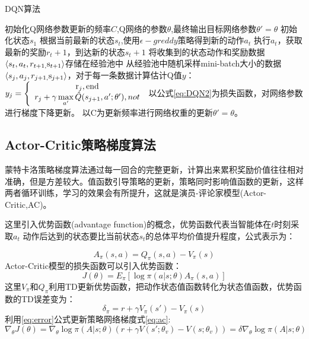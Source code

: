 \begin{algorithm}
	\caption{DQN算法}
	\label{algoDQN}
	\begin{algorithmic}[1] %
		\State 初始化Q网络参数更新的频率$C$,Q网络的参数$\theta$,最终输出目标网络参数$\theta ' = \theta $
		\State 初始化状态$ {s_1}$
		\State 根据当前最新的状态$ {s_t}$,使用$\epsilon - greddy$策略得到新的动作$a_t $
		\State 执行$a_t $，获取最新的奖励$ r_t+1 $，到达新的状态$ {s_t+1}$
		\State 将收集到的状态动作和奖励数据$ \left\langle {{s_t},{a_t},{r_{t + 1,}}{{\rm{s}}_{t + 1}}} \right\rangle $存储在经验池中
		\State 从经验池中随机采样mini-batch大小的数据$ \left\langle {{s_j},{a_j},{r_{j + 1,}}{{\rm{s}}_{j + 1}}} \right\rangle $，对于每一条数据计算估计Q值$y$：$ {y_j} = \left\{ {\begin{array}{*{20}{c}}
			{{{\rm{r}}_j}{\rm{,end}}}\\
			{{r_j} + \gamma \mathop {\max }\limits_{a'} \hat Q({s_{j + 1}},a';\theta '),not}
			\end{array}} \right.$
		\State 以公式\ref{eq:DQN2}为损失函数，对网络参数进行梯度下降更新。
		\State 以C为更新频率进行网络权重的更新$\theta ' = \theta $。
		\EndFor
		\EndFor
	\end{algorithmic}
\end{algorithm}
\subsection{Actor-Critic策略梯度算法}
蒙特卡洛策略梯度算法通过每一回合的完整更新，计算出来累积奖励价值往往相对准确，但是方差较大。值函数引导策略的更新，策略同时影响值函数的更新，这样两者循环训练，学习的效果会有所提升，这就是演员-评论家模型(Actor-Critic,AC)。

这里引入优势函数(advantage function)的概念，优势函数代表当智能体在$t$时刻采取$a_t$ 动作后达到的状态要比当前状态$s_t$的总体平均价值提升程度，公式表示为：

\begin{equation}
{A_\pi }(s,a) = {Q_\pi }(s,a) - {V_\pi }(s)
\end{equation}
Actor-Critic模型的损失函数可以引入优势函数：
\begin{equation}
\label{eq:ac}
J(\theta ) = {E_\pi }[\log \pi (a|s;\theta ){A_\pi }(s,a)]
\end{equation}
这里${V_\pi } $和$ {Q_\pi } $利用TD更新优势函数，把动作状态值函数转化为状态值函数，优势函数的TD误差变为：
\begin{equation}
\label{eq:error}
{\delta _\pi } = r + \gamma {V_\pi }(s') - {V_\pi }(s)
\end{equation}
利用\ref{eq:error}公式更新策略网络梯度式\ref{eq:ac}:
\begin{equation}
{\nabla _\theta }J(\theta ) = {\nabla _\theta }\log \pi (A|s;\theta )(r + \gamma V(s';{\theta _v}) - V(s;{\theta _v})) = \delta {\nabla _\theta }\log \pi (A|s;\theta )
\end{equation}

